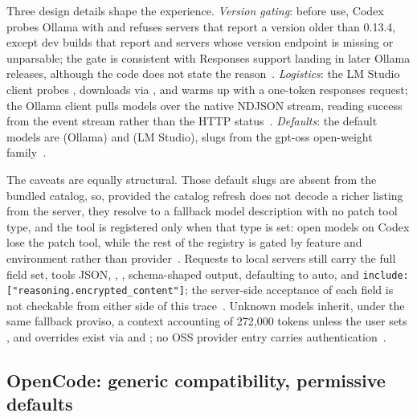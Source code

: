 \documentclass{article}
\newcommand{\codex}[0]{Codex}
\begin{document}
Three design details shape the experience. \emph{Version gating}: before
use, \codex{} probes Ollama with  and refuses
servers that report a version older than 0.13.4, except dev builds that
report  and servers whose version endpoint is missing or
unparsable; the gate is consistent with Responses support landing in
later Ollama releases, although the code does not state the
reason~\citep{codexRepo,ollamaCompatDocs}. \emph{Logistics}: the LM
Studio client probes , downloads via
, and warms up with a one-token responses request;
the Ollama client pulls models over the native  NDJSON
stream, reading success from the event stream rather than the HTTP
status~\citep{codexRepo}. \emph{Defaults}: the default models are
 (Ollama) and  (LM Studio),
slugs from the gpt-oss open-weight family~\citep{codexRepo}.

The caveats are equally structural. Those default slugs are absent from
the bundled catalog, so, provided the catalog refresh does not decode a
richer listing from the server, they resolve to a fallback model
description with no patch tool type, and the  tool is
registered only when that type is set: open models on \codex{} lose the
patch tool, while the rest of the registry is gated by feature and
environment rather than provider~\citep{codexRepo}. Requests to local
servers still carry the full field set, tools JSON,
, , schema-shaped
output,  defaulting to auto, and
\texttt{include: ["reasoning.encrypted\_content"]}; the server-side
acceptance of each field is not checkable from either side of this
trace~\citep{codexRepo,lmstudioApiDocs,llamaCppServerDocs}. Unknown
models inherit, under the same fallback proviso, a context accounting
of 272{,}000 tokens unless the user sets
, and overrides exist via
 and ; no OSS provider
entry carries authentication~\citep{codexRepo}.

\subsection{OpenCode: generic compatibility, permissive defaults}
\label{sec:compatopencode}
\end{document}
